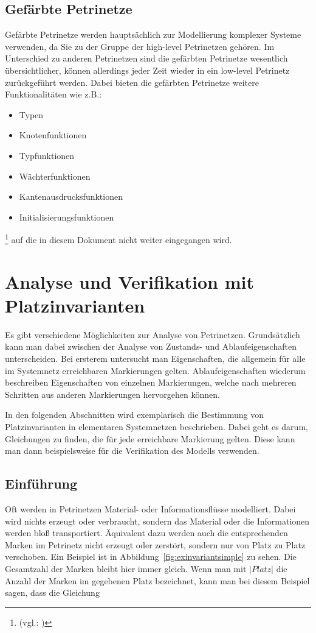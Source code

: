 	\subsection{Gefärbte Petrinetze}
		Gefärbte Petrinetze werden hauptsächlich zur Modellierung komplexer Systeme verwenden, da Sie zu der Gruppe der high-level Petrinetzen gehören.
		Im Unterschied zu anderen Petrinetzen sind die gefärbten Petrinetze wesentlich übersichtlicher, können allerdings jeder Zeit wieder in ein low-level Petrinetz zurückgeführt werden.
		Dabei bieten die gefärbten Petrinetze weitere Funktionalitäten wie z.B.:
		\begin{itemize}
		    \item Typen
		    \item Knotenfunktionen
		    \item Typfunktionen
		    \item Wächterfunktionen
		    \item Kantenausdrucksfunktionen
		    \item Initialisierungsfunktionen
		\end{itemize}
		\footnote{(vgl.: \cite{tu_dresden:petrinetze})}
		auf die in diesem Dokument nicht weiter eingegangen wird.

\section{Analyse und Verifikation mit Platzinvarianten}
	Es gibt verschiedene Möglichkeiten zur Analyse von Petrinetzen. Grundsätzlich kann man dabei zwischen der Analyse von Zustands- und Ablaufeigenschaften unterscheiden. Bei ersterem untersucht man Eigenschaften, die allgemein für alle im Systemnetz erreichbaren Markierungen gelten. Ablaufeigenschaften wiederum beschreiben Eigenschaften von einzelnen Markierungen, welche nach mehreren Schritten aus anderen Markierungen hervorgehen können.

	In den folgenden Abschnitten wird exemplarisch die Bestimmung von Platzinvarianten in elementaren Systemnetzen beschrieben. Dabei geht es darum, Gleichungen zu finden, die für jede erreichbare Markierung gelten. Diese kann man dann beispielsweise für die Verifikation des Modells verwenden.

	\subsection{Einführung}
	\label{sub:platzinvarianten_einf}
		Oft werden in Petrinetzen Material- oder Informationsflüsse modelliert. Dabei wird nichts erzeugt oder verbraucht, sondern das Material oder die Informationen werden bloß transportiert. Äquivalent dazu werden auch die entsprechenden Marken im Petrinetz nicht erzeugt oder zerstört, sondern nur von Platz zu Platz verschoben. Ein Beispiel ist in Abbildung~\ref{fig:exinvariantsimple} zu sehen. Die Gesamtzahl der Marken bleibt hier immer gleich. Wenn man mit $|Platz|$ die Anzahl der Marken im gegebenen Platz bezeichnet, kann man bei diesem Beispiel sagen, dass die Gleichung

